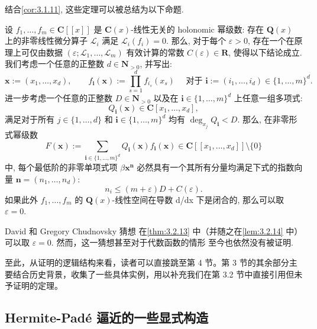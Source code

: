 结合\autoref{cor:3.1.11}, 这些定理可以被总结为以下命题.

\begin{lemma}\label{lem:3.2.14}
设 \(f_1, \dots, f_m \in \mathbf{C}[\![x]\!]\) 是 \(\mathbf{C}(x)\)-线性无关的 holonomic 幂级数: 
存在 \(\mathbf{Q}(x)\) 上的非零线性微分算子 \(\mathcal{L}_i\) 满足 \(\mathcal{L}_i(f_i) = 0\). 
那么, 对于每个 \(\varepsilon > 0\), 存在一个在原理上可仅由数据 \((\varepsilon;\mathcal{L}_1, \ldots,\mathcal{L}_m)\) 有效计算的常数 \(C(\varepsilon) \in \mathbf{R}\), 
使得以下结论成立.
我们考虑一个任意的正整数 \(d \in \mathbf{N}_{>0}\), 并写出:
\[ \mathbf{x} := (x_1, \dots, x_d), \qquad f_{\mathbf{i}}(\mathbf{x}) := \prod_{s=1}^d f_{i_s}(x_s) \quad \text{ 对于 } \mathbf{i} := (i_1, \dots, i_d) \in \{1, \dots, m\}^d. \]
进一步考虑一个任意的正整数 \(D \in \mathbf{N}_{>0}\) 以及在 \(\mathbf{i} \in \{1, \dots, m\}^d\) 上任意一组多项式:
\[ Q_{\mathbf{i}}(\mathbf{x}) \in \mathbf{C}[x_1, \dots, x_d], \]
满足对于所有 \(j \in \{1, \dots, d\}\) 和 \(\mathbf{i} \in \{1, \dots, m\}^d\) 均有 \(\deg_{x_j} Q_{\mathbf{i}} < D\).
那么, 在非零形式幂级数
\[ F(\mathbf{x}) := \sum_{\mathbf{i} \in \{1, \dots, m\}^d} Q_{\mathbf{i}}(\mathbf{x}) f_{\mathbf{i}}(\mathbf{x}) \in \mathbf{C}[\![x_1, \dots, x_d]\!] \setminus \{0\} \]
中, 每个最低阶的非零单项式项 \(\beta \mathbf{x}^{\mathbf{n}}\) 必然具有一个其所有分量均满足下式的指数向量 \(\mathbf{n} = (n_1, \dots, n_d)\):
\[ n_i \le (m+\varepsilon)D + C(\varepsilon). \]
如果此外 \(f_1, \ldots, f_m\) 的 \(\mathbf{Q}(x)\)-线性空间在导数 d/dx 下是闭合的, 那么可以取 \(\varepsilon = 0\).
\end{lemma}

\begin{remark}\label{rem:3.2.15}
David 和 Gregory Chudnovsky 猜想 \cite[第 5161 页]{CC83} 在\autoref{thm:3.2.13} 中（并随之在\autoref{lem:3.2.14} 中）可以取 \(\varepsilon = 0\). 然而，这一猜想甚至对于代数函数的情形 \cite{Wan04} 至今也依然没有被证明.
\end{remark}


至此，从证明的逻辑结构来看，读者可以直接跳至第 4 节。第 3 节的其余部分主要结合历史背景，收集了一些具体实例，用以补充我们在第 3.2 节中直接引用但未予证明的定理。


\subsection{Hermite-Pad{\'e} 逼近的一些显式构造}\label{sec:3.3}

